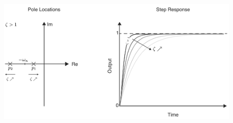 \documentclass[twoside]{article}
\begin{document}
    \begin{minipage}[h]{1\linewidth}
    \begin{center}
     \includegraphics[width=0.9\textwidth]{over}
    \end{center}
  \end{minipage}
\end{document}
